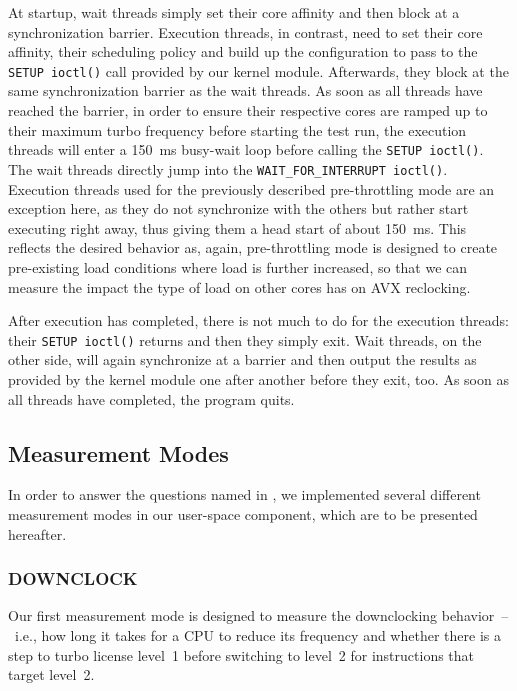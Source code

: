 At startup, wait threads simply set their core affinity and then block at a synchronization barrier. Execution threads, in contrast, need to set their core affinity, their scheduling policy and build up the configuration to pass to the \texttt{SETUP ioctl()} call provided by our kernel module. Afterwards, they block at the same synchronization barrier as the wait threads. As soon as all threads have reached the barrier, in order to ensure their respective cores are ramped up to their maximum turbo frequency before starting the test run, the execution threads will enter a \SI{150}{\milli\second} busy-wait loop before calling the \texttt{SETUP ioctl()}. The wait threads directly jump into the \texttt{WAIT\_FOR\_INTERRUPT ioctl()}. Execution threads used for the previously described pre-throttling mode are an exception here, as they do not synchronize with the others but rather start executing right away, thus giving them a head start of about \SI{150}{\milli\second}. This reflects the desired behavior as, again, pre-throttling mode is designed to create pre-existing load conditions where load is further increased, so that we can measure the impact the type of load on other cores has on \gls{AVX} reclocking.

After execution has completed, there is not much to do for the execution threads: their \texttt{SETUP ioctl()} returns and then they simply exit. Wait threads, on the other side, will again synchronize at a barrier and then output the results as provided by the kernel module one after another before they exit, too. As soon as all threads have completed, the program quits.

\subsection{Measurement Modes}
\label{sec:analysis:design:measurementmodes}

In order to answer the questions named in , we implemented several different measurement modes in our user-space component, which are to be presented hereafter.

\subsubsection{DOWNCLOCK}
\label{sec:analysis:design:measurementmodes:downclock}

Our first measurement mode is designed to measure the downclocking behavior~--~i.e., how long it takes for a \gls{CPU} to reduce its frequency and whether there is a step to turbo license level~1 before switching to level~2 for instructions that target level~2.

